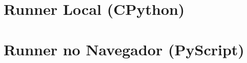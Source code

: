 \section{Runner Local (CPython)}
\label{ap:bench_local}



\section{Runner no Navegador (PyScript)}
\label{ap:bench_browser}


